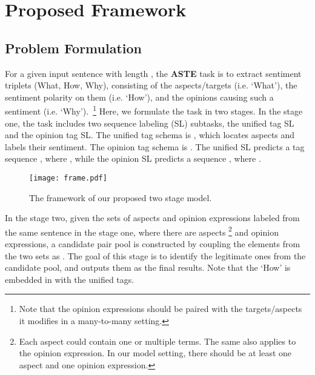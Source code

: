 \documentclass[letterpaper]{article} \usepackage{aaai20}  \usepackage{times}  \usepackage{helvet} \usepackage{courier}  \usepackage[hyphens]{url}  \usepackage{graphicx} \urlstyle{rm} \def\UrlFont{\rm}  \usepackage{graphicx}  \frenchspacing  \setlength{\pdfpagewidth}{8.5in}  \setlength{\pdfpageheight}{11in}
\begin{document}
\section{Proposed Framework}\label{sec:proposedframwork}



\subsection{Problem Formulation}
For a given input sentence  with length , the \textbf{ASTE} task is to extract sentiment triplets (What, How, Why), consisting of the aspects/targets (i.e. `What'), the sentiment polarity on them (i.e. `How'), and the opinions causing such a sentiment (i.e. `Why').~\footnote{Note that the opinion expressions should be paired with the targets/aspects it modifies in a many-to-many setting.}
Here, we formulate the task in two stages.
In the stage one, the task includes two sequence labeling (SL) subtasks, the unified tag SL and the opinion tag SL. The unified tag schema is , which locates aspects and labels their sentiment.
The opinion tag schema is . The unified SL predicts a tag sequence , where , while the opinion SL predicts a sequence , where .

    \begin{figure}[!t]
        \centering
        \texttt{[image: frame.pdf]}
        \caption{The framework of our proposed two stage model.}
        \label{fig:framework}
    \end{figure}


In the stage two, given the sets of aspects  and opinion expressions  labeled from the same sentence in the stage one, where there are  aspects \footnote{Each aspect could contain one or multiple terms. The same also applies to the opinion expression. In our model setting, there should be at least one aspect and one opinion expression.} and  opinion expressions, a candidate pair pool is constructed by coupling the elements from the two sets as . The goal of this stage is to identify the legitimate ones from the candidate pool, and outputs them as the final results. Note that the `How' is embedded in  with the unified tags.
\end{document}
